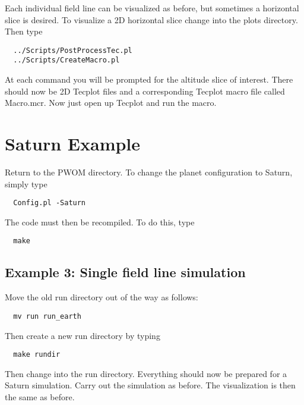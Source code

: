 Each individual field line can be visualized as before, but sometimes a 
horizontal slice is desired. To visualize a 2D horizontal slice change into 
the plots directory. Then type 
\begin{verbatim}
  ../Scripts/PostProcessTec.pl
  ../Scripts/CreateMacro.pl
\end{verbatim}
At each command you will be prompted for the altitude slice of interest. 
There should now be 2D Tecplot files and a corresponding Tecplot 
macro file called Macro.mcr. Now just open up Tecplot and run the macro.

\section{Saturn Example}
Return to the PWOM directory. To change the planet configuration to Saturn, 
simply type
\begin{verbatim}
  Config.pl -Saturn
\end{verbatim}
The code must then be recompiled. To do this, type 
\begin{verbatim}
  make
\end{verbatim}

\subsection{Example 3: Single field line simulation}
Move the old run directory out of the way as follows:
\begin{verbatim}
  mv run run_earth
\end{verbatim}
Then create a new run directory by typing
\begin{verbatim}
  make rundir
\end{verbatim}
Then change into the run directory. Everything should now be prepared 
for a Saturn simulation. Carry out the simulation as before. The visualization 
is then the same as before. 
